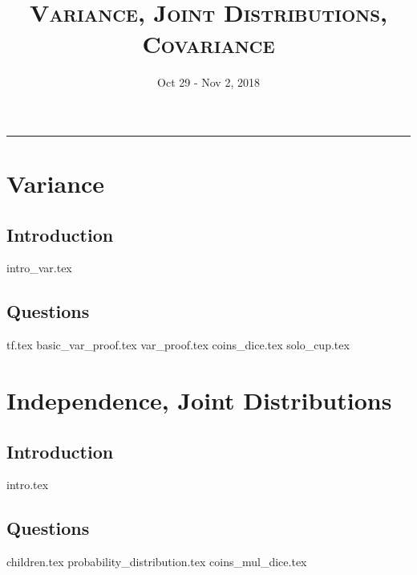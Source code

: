 \documentclass{exam}
\title{\textsc{Variance, Joint Distributions, Covariance}}
\date{Oct 29 - Nov 2, 2018}
\begin{document}
\maketitle
\rule{\textwidth}{0.15em}
\fontsize{12}{15}\selectfont
\thispagestyle{empty}


\section{Variance}
\subsection{Introduction}
{intro_var.tex}
\subsection{Questions}
\begin{questions}
{tf.tex}
{basic_var_proof.tex}
{var_proof.tex}
{coins_dice.tex}
{solo_cup.tex}
\end {questions}

\section{Independence, Joint Distributions}
\subsection{Introduction}
{intro.tex}
\subsection{Questions}
\begin{questions}
{children.tex}
{probability_distribution.tex}
{coins_mul_dice.tex} 
\end{questions}
\end{document}
